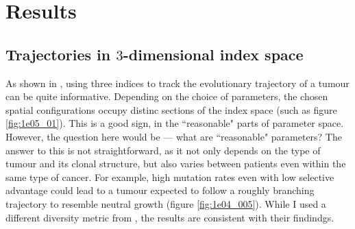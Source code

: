 \section{Results}

\subsection{Trajectories in $3$-dimensional index space}

As shown in \cite{noble_spatial_2022}, using three indices to track the
evolutionary trajectory of a tumour can be quite informative. Depending on the
choice of parameters, the chosen spatial configurations occupy distinc sections
of the index space (such as figure \ref{fig:1e05_01}). This is a good sign, in
the ``reasonable" parts of parameter space. However, the question here would be
--- what are ``reasonable" parameters? The answer to this is not
straightforward, as it not only depends on the type of tumour and its clonal
structure, but also varies between patients even within the same type of
cancer. For example, high mutation rates even with low selective advantage
could lead to a tumour expected to follow a roughly branching trajectory to
resemble neutral growth (figure \ref{fig:1e04_005}). While I used a different
diversity metric from \cite{noble_spatial_2022}, the results are consistent with
their findindgs.

